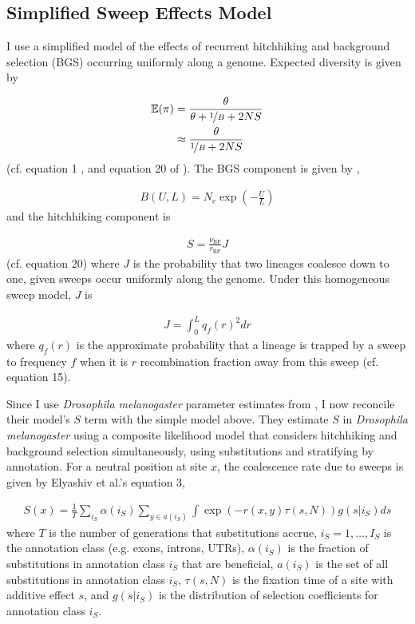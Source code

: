 \documentclass[9pt,lineno]{elife}
\newcommand{\E}{\mathbb{E}}
\begin{document}
\appendix
\begin{appendixbox}
\section{Simplified Sweep Effects Model}
\label{app:sweep}

I use a simplified model of the effects of recurrent hitchhiking and background
selection (BGS) occurring uniformly along a genome. Expected diversity is given
by

\begin{align}
  \E(\pi) &= \frac{\theta}{\theta + \nicefrac{1}{B} + 2NS} \\
          &\approx \frac{\theta}{\nicefrac{1}{B} + 2NS} 
\end{align}
%
(cf. equation 1 \cite{Elyashiv2016-vt}, and equation 20 of \cite{Coop2012-cd}).
The BGS component is given by \cite{Hudson1995-xc},

\begin{align}
  B(U, L) = N_e \exp\left(-\frac{U}{L}\right)
\end{align}
%
and the hitchhiking component is

\begin{align}
  S = \frac{\nu_\text{BP}}{r_\text{BP}} J
\end{align}
%
(cf. \cite{Coop2012-cd} equation 20) where $J$ is the probability that two
lineages coalesce down to one, given sweeps occur uniformly along the genome.
Under this homogeneous sweep model, $J$ is 

\begin{align}
  J = \int_0^L q_f(r)^2 dr 
\end{align}
%
where $q_f(r)$ is the approximate probability that a lineage is trapped by a
sweep to frequency $f$ when it is $r$ recombination fraction away from this
sweep (cf. \cite{Coop2012-cd} equation 15). 

Since I use \emph{Drosophila melanogaster} parameter estimates from
\cite{Elyashiv2016-vt}, I now reconcile their model's $S$ term with the
simple model above. They estimate $S$ in \emph{Drosophila melanogaster} using a
composite likelihood model that considers hitchhiking and background selection
simultaneously, using substitutions and stratifying by annotation.  For a
neutral position at site $x$, the coalescence rate due to sweeps is given by
Elyashiv et al.'s equation 3, 

\begin{align}
  S(x) = \frac{1}{T} \sum_{i_S} \alpha(i_S) \sum_{y \in a(i_S)} \int \exp(-r(x, y) \tau(s, N)) g(s | i_S) ds
\end{align}
%
where $T$ is the number of generations that substitutions accrue, $i_S = 1,
\ldots, I_S$ is the annotation class (e.g. exons, introns, UTRs), $\alpha(i_S)$
is the fraction of substitutions in annotation class $i_S$ that are beneficial,
$a(i_S)$ is the set of all substitutions in annotation class $i_S$, $\tau(s,
N)$ is the fixation time of a site with additive effect $s$, and $g(s | i_S)$
is the distribution of selection coefficients for annotation class $i_S$. 


\end{appendixbox}
\end{document}
